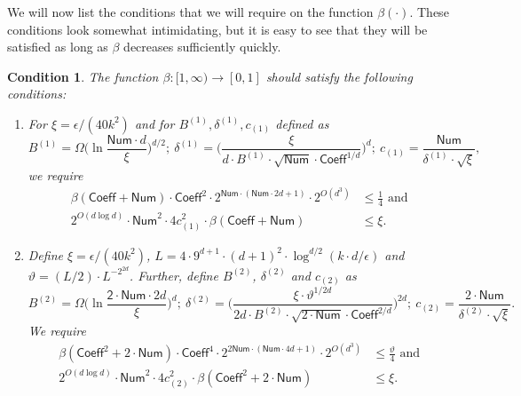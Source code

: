 \documentclass{toc}
\newtheorem{cond}[theorem]{Condition}
\begin{document}
We will now list the conditions that we will require on the function $\beta(\cdot)$.
These conditions look somewhat intimidating, but it is easy to see that they
will be satisfied as long as $\beta$ decreases sufficiently quickly.
\begin{cond}\label{cond:enforce-beta}
The function $\beta: [1, \infty) \rightarrow [0,1]$ should satisfy the following conditions: 
\begin{enumerate}
\item For $\xi = {\epsilon}/{(40k^2)}$ and 
for $B^{(1)}, \delta^{(1)}, c_{(1)}$ defined as \[
B^{(1)} = \Omega\bigg( \ln  \frac{\mathsf{Num} \cdot d}{\xi} \bigg)^{d/2} ;  \ \delta^{(1)} = \bigg( \frac{\xi}{d \cdot B^{(1)} \cdot \sqrt{\mathsf{Num}} \cdot \mathsf{Coeff}^{1/d}} \bigg)^d; \   c_{(1)} = \frac{\mathsf{Num}}{\delta^{(1)} \cdot \sqrt{\xi}},
\]
we  require
\begin{align*}
    \beta(\mathsf{Coeff} + \mathsf{Num}) \cdot \mathsf{Coeff}^2 \cdot 2^{\mathsf{Num} \cdot (\mathsf{Num}\cdot 2d+1)} \cdot 2^{O(d^3)} &\leq \frac{1}{4} \text{ and }\\
    2^{O(d \log d)} \cdot \mathsf{Num}^2 \cdot 4c_{(1)}^{2} \cdot \beta(\mathsf{Coeff} + \mathsf{Num}) &\le \xi.
\end{align*}
\item Define  $\xi = {\epsilon}/{(40k^2)}$, $L = 4 \cdot 9^{d+1} \cdot
    (d+1)^2 \cdot \log^{d/2} (k \cdot d/\epsilon) $ and $\vartheta = ({L}/{2}) \cdot
    L^{-2^{2d}}$. Further,  define $B^{(2)}$, $\delta^{(2)}$
    and $c_{(2)}$ as
\[
B^{(2)} = \Omega\bigg( \ln  \frac{\mathsf{2\cdot Num} \cdot 2d}{\xi} \bigg)^{d} ;  \ \delta^{(2)} = \bigg( \frac{\xi \cdot \vartheta^{1/2d}}{2d \cdot B^{(2)} \cdot \sqrt{2 \cdot \mathsf{Num}} \cdot \mathsf{Coeff}^{2/d}} \bigg)^{2d}; \   c_{(2)} = \frac{2 \cdot \mathsf{Num}}{\delta^{(2)} \cdot \sqrt{\xi}}.
\]
We require
\begin{align*}
    \beta(\mathsf{Coeff}^2 + 2 \cdot \mathsf{Num}) \cdot \mathsf{Coeff}^4 \cdot 2^{2\mathsf{Num} \cdot (\mathsf{Num}\cdot 4d+1)} \cdot 2^{O(d^3)} &\leq \frac{\vartheta}{4} \text{ and } \\
    2^{O(d \log d)} \cdot \mathsf{Num}^2 \cdot 4c_{(2)}^{2} \cdot \beta(\mathsf{Coeff}^2 + 2 \cdot \mathsf{Num}) &\le \xi.
 \end{align*}
\end{enumerate}
\end{cond}
\end{document}

